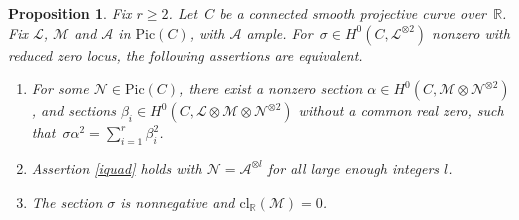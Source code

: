 \documentclass{amsart}
\newtheorem{prop}[thm]{Proposition}
\theoremstyle{definition}
\theoremstyle{remark}
\numberwithin{equation}{section}
\newcommand{\cl}{\mathrm{cl}}
\newcommand{\Pic}{\mathrm{Pic}}
\def\R{\mathbb R}
\def\cA{\mathcal{A}}
\def\cN{\mathcal{N}}
\def\cM{\mathcal{M}}
\def\cL{\mathcal{L}}
\def\cM{\mathcal{M}}
\begin{document}
\begin{prop}
\label{condition1prop}
Fix $r\geq 2$. Let~$C$ be a connected smooth projective curve over~$\R$. Fix $\cL$, $\cM$ 
 and $\cA$ in $\Pic(C)$, with $\cA$ ample. For~${\sigma\in H^0(C,\cL^{\otimes 2})}$ nonzero with reduced zero locus, the following assertions are \mbox{equivalent}.
\begin{enumerate}[label=(\roman*)] 
\item
\label{iquaR}
For some $\cN\in\Pic(C)$, there exist a nonzero section $\alpha\in H^0(C,\cM\otimes\cN^{\otimes 2})$, and sections $\beta_{i}\in H^0(C,\cL\otimes\cM\otimes\cN^{\otimes 2})$ without a common real zero, such that~$\sigma\alpha^2=\sum_{i=1}^r\beta_{i}^2$.
 \item
 \label{iiquaR}
 Assertion \ref{iquad} holds with $\cN=\cA^{\otimes l}$ for all large enough integers $l$.
 \item
 \label{iiiquaR}
The section $\sigma$ is nonnegative and $\cl_{\R}(\cM)=0$.
\end{enumerate}
\end{prop}
\end{document}
